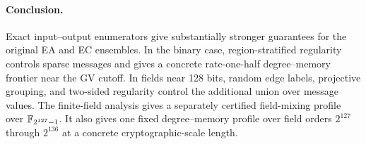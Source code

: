 \paragraph{Conclusion.}
Exact input--output enumerators give substantially stronger guarantees for
the original EA and EC ensembles.  In the binary case, region-stratified
regularity controls sparse messages and gives a concrete rate-one-half
degree--memory frontier near the GV cutoff.  In fields near 128 bits, random
edge labels, projective grouping, and two-sided regularity control the
additional union over message values.  The finite-field analysis gives a
separately certified field-mixing profile over $\mathbb F_{2^{127}-1}$.  It also
gives one fixed degree--memory profile over field orders $2^{127}$ through
$2^{136}$ at a concrete cryptographic-scale length.
